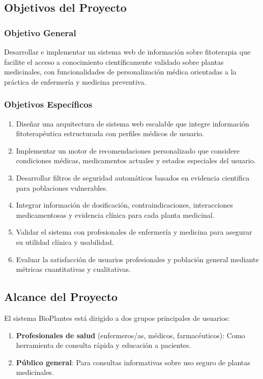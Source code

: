 \documentclass[12pt,a4paper]{article}
\begin{document}
\subsection{Objetivos del Proyecto}

\subsubsection{Objetivo General}

Desarrollar e implementar un sistema web de información sobre fitoterapia que facilite el acceso a conocimiento científicamente validado sobre plantas medicinales, con funcionalidades de personalización médica orientadas a la práctica de enfermería y medicina preventiva.

\subsubsection{Objetivos Específicos}

\begin{enumerate}
    \item Diseñar una arquitectura de sistema web escalable que integre información fitoterapéutica estructurada con perfiles médicos de usuario.
    \item Implementar un motor de recomendaciones personalizado que considere condiciones médicas, medicamentos actuales y estados especiales del usuario.
    \item Desarrollar filtros de seguridad automáticos basados en evidencia científica para poblaciones vulnerables.
    \item Integrar información de dosificación, contraindicaciones, interacciones medicamentosas y evidencia clínica para cada planta medicinal.
    \item Validar el sistema con profesionales de enfermería y medicina para asegurar su utilidad clínica y usabilidad.
    \item Evaluar la satisfacción de usuarios profesionales y población general mediante métricas cuantitativas y cualitativas.
\end{enumerate}

\subsection{Alcance del Proyecto}

El sistema BioPlantes está dirigido a dos grupos principales de usuarios:

\begin{enumerate}
    \item \textbf{Profesionales de salud} (enfermeros/as, médicos, farmacéuticos): Como herramienta de consulta rápida y educación a pacientes.
    \item \textbf{Público general}: Para consultas informativas sobre uso seguro de plantas medicinales.
\end{enumerate}
\end{document}
